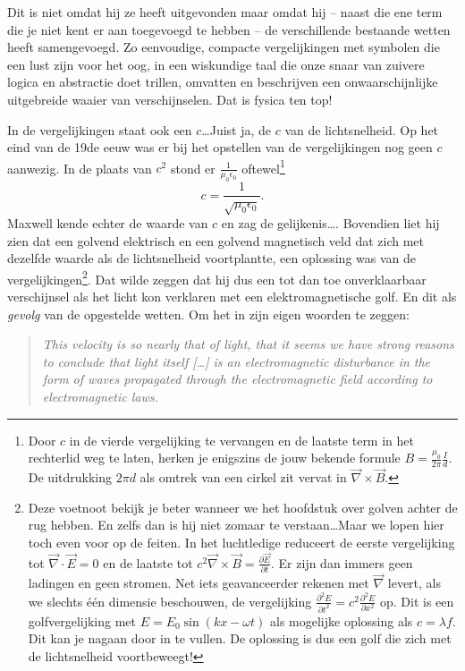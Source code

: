 \documentclass{ximera}
\begin{document}
	Dit is niet omdat hij ze heeft uitgevonden maar omdat hij -- naast die ene term die je niet kent er aan toegevoegd te hebben -- de verschillende bestaande wetten heeft samengevoegd. Zo eenvoudige, compacte vergelijkingen met symbolen die een lust zijn voor het oog, in een wiskundige taal die onze snaar van zuivere logica en abstractie doet trillen, omvatten en beschrijven een onwaarschijnlijke uitgebreide waaier van verschijnselen. Dat is fysica ten top!
	
	In de vergelijkingen staat ook een $c$\ldots Juist ja, de $c$ van de lichtsnelheid. Op het eind van de 19de eeuw was er bij het opstellen van de vergelijkingen nog geen $c$ aanwezig. In de plaats van $c^2$ stond er $\frac{1}{\mu_0\epsilon_0}$ oftewel\footnote{Door $c$ in de vierde vergelijking te vervangen en de laatste term in het rechterlid weg te laten, herken je enigszins de jouw bekende formule $B=\frac{\mu_0}{2\pi}\frac{I}{d}$. De uitdrukking $2\pi d$ als omtrek van een cirkel zit vervat in $\vec{\nabla}\times\vec{B}$.}
	\begin{equation}
		c=\frac{1}{\sqrt{\mu_0\epsilon_0}}.
	\end{equation}
	Maxwell kende echter de waarde van $c$ en zag de gelijkenis\ldots. Bovendien liet hij zien dat een golvend elektrisch en een golvend magnetisch veld dat zich met dezelfde waarde als de lichtsnelheid voortplantte, een oplossing was van de vergelijkingen\footnote{Deze voetnoot bekijk je beter wanneer we het hoofdstuk over golven achter de rug hebben. En zelfs dan is hij niet zomaar te verstaan\ldots Maar we lopen hier toch even voor op de feiten. In het luchtledige reduceert de eerste vergelijking tot $\vec{\nabla}\cdot\vec{E}=0$ en de laatste tot $c^2\vec{\nabla}\times\vec{B}=\frac{\partial\vec{E}}{\partial t}$. Er zijn dan immers geen ladingen en geen stromen. Net iets geavanceerder rekenen met $\vec{\nabla}$ levert, als we slechts \'e\'en dimensie beschouwen, de vergelijking $\frac{\partial^2E}{\partial t^2}=c^2\frac{\partial^2E}{\partial x^2}$ op. Dit is een golfvergelijking met $E=E_0\sin(kx -\omega t)$ als mogelijke oplossing als $c=\lambda f$. Dit kan je nagaan door in te vullen. De oplossing is dus een golf die zich met de lichtsnelheid voortbeweegt!}. Dat wilde zeggen dat hij dus een tot dan toe onverklaarbaar verschijnsel als het licht kon verklaren met een elektromagnetische golf. En dit als \emph{gevolg} van de opgestelde wetten. Om het in zijn eigen woorden te zeggen:
	\begin{quotation}
	\emph{This velocity is so nearly that of light, that it seems we have strong reasons to conclude that light itself [\ldots] is an electromagnetic disturbance in the form of waves propagated through the electromagnetic field according to electromagnetic laws.}
	\end{quotation}
\end{document}
